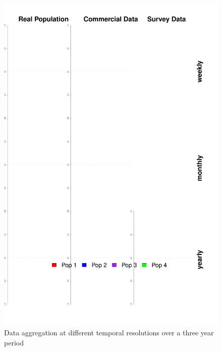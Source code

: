 \documentclass[review]{elsarticle}
\begin{document}
\begin{figure}[!ht]
	\includegraphics[width =\linewidth]{../analysis/Data_Aggregation_time_Rev}
	\caption{Data aggregation at different temporal resolutions over a
		three year period}
	\label{fig:2}
\end{figure}	
\end{document}
